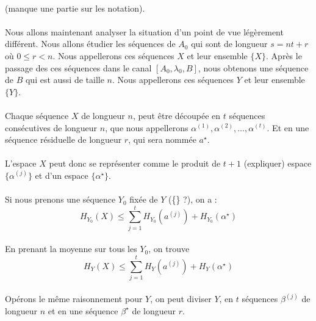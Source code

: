 	\paragraph{}
	(manque une partie sur les notation).
	
	\paragraph{}
	Nous allons maintenant analyser la situation d'un point de vue légèrement différent. Nous allons étudier les séquences de $A_0$ qui sont de longueur $s = nt+r$
	où $0\le r < n$. Nous appellerons ces séquences $X$ et leur ensemble $\{X\}$. Après le passage des ces séquences dans le canal $[A_0,\lambda_0,B]$, nous obtenons
	une séquence de $B$ qui est aussi de taille $n$. Nous appellerons ces séquences $Y$ et leur ensemble $\{Y\}$.
	
	\paragraph{}
	Chaque séquence $X$ de longueur $n$, peut être découpée en $t$ séquences consécutives de longueur $n$, que nous appellerons $\alpha^{(1)}, \alpha^{(2)}, \dots, \alpha^{(t)}$.
	Et en une séquence résiduelle de longueur $r$, qui sera nommée $a^\star$.
	
	\paragraph{}
	L'espace ${X}$ peut donc se représenter comme le produit de $t+1$ (expliquer) espace $\{\alpha^{(j)}\}$ et d'un espace $\{\alpha^\star\}$.
	
	\paragraph{}
	Si nous prenons une séquence $Y_0$ fixée de $Y$ (\{\} ?), on a :
	\[H_{Y_0}(X)\le \sum_{j=1}^tH_{Y_0}\left(a^{(j)}\right)+H_{Y_0}(\alpha^\star)\]
	
	\paragraph{}
	En prenant la moyenne sur tous les $Y_0$, on trouve
	\[H_Y(X)\le \sum_{j=1}^tH_Y\left(a^{(j)}\right)+H_Y(\alpha^\star)\]
	
	\paragraph{}
	Opérons le même raisonnement pour $Y$, on peut diviser $Y$, en $t$ séquences $\beta^{(j)}$ de longueur $n$ et en une séquence ${\beta^\star}$ de longueur $r$. 
	
